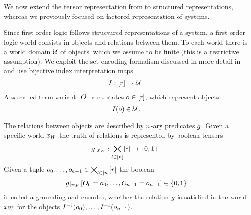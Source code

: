 \chapter{\chatextfolModels}\label{cha:folModels}

We now extend the tensor representation from to structured representations, whereas we previously focused on factored representation of systems.





%


Since first-order logic follows structured representations of a system, a first-order logic world consists in objects and relations between them.
To each world there is a world domain $\mathcal{U}$ of objects, which we assume to be finite (this is a restrictive assumption).
We exploit the set-encoding formalism discussed in more detail in  and use bijective index interpretation maps
\begin{align*}
    I : [r] \rightarrow \mathcal{U} \, .
\end{align*}
A so-called term variable $O$ takes states $o\in[r]$, which represent objects
\begin{align*}
    I(o) \in \mathcal{U} \, .
\end{align*}

%
The relations between objects are described by $n$-ary predicates $g$.
Given a specific world $x_{W}$ the truth of relations is represented by boolean tensors
\begin{align*}
    {g}|_{x_{W}} : \bigtimes_{l\in[n]}[r]\rightarrow\{0,1\} \, .
\end{align*}
Given a tuple $o_{0},\ldots,o_{n-1}\in\bigtimes_{l\in[n]}[r]$ the boolean
\begin{align*}
    {g}|_{x_{W}} \left[O_{0}=o_{0},\ldots,O_{n-1}=o_{n-1}\right] \in\{0,1\}
\end{align*}
is called a grounding and encodes, whether the relation $g$ is satisfied in the world $x_{W}$ for the objects $I^{-1}(o_{0}),\ldots,I^{-1}(o_{n-1})$.

